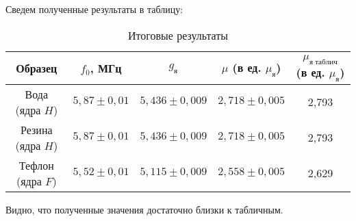 \documentclass[12pt]{kiarticle}
\begin{document}
	Сведем полученные результаты в таблицу:
	
	
	\begin{table}[h!]
		\caption{Итоговые результаты}
		\begin{center}
			\begin{tabular}{|c|c|c|c|c|}
				\hline
				Образец  & $ f_0 $, МГц &$ g_я $  & $ \mu $ (в ед. $ \mu_я $) & $ \mu_{я\; таблич} $ (в ед. $ \mu_я $) \\ \hline
				Вода (ядра $ H $)  & $ 5,87 \pm 0,01 $ &   $ 5,436 \pm 0,009 $   &  $ 2,718 \pm 0,005 $  & 2,793 \\
				Резина (ядра $ H $)  & $ 5,87 \pm 0,01 $ &   $ 5,436 \pm 0,009 $   &  $ 2,718 \pm 0,005 $  & 2,793 \\
				Тефлон (ядра $ F $)  & $ 5,52 \pm 0,01 $ &   $ 5,115 \pm 0,009 $   &  $ 2,558 \pm 0,005 $  & 2,629 \\
				 \hline
			\end{tabular}
		\end{center}
		\label{table_5}
	\end{table}

	Видно, что полученные значения достаточно близки к табличным. 
	
\end{document}
